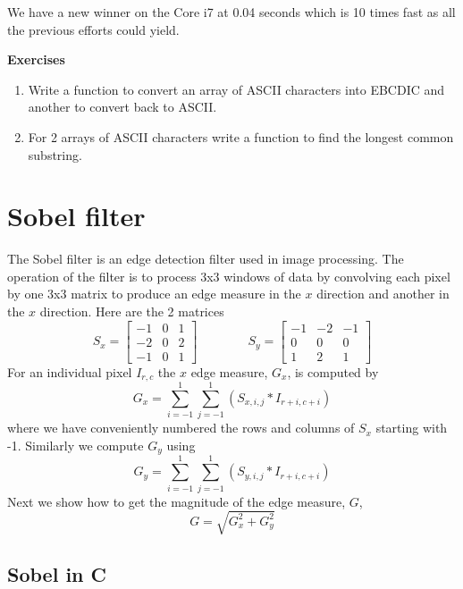 \documentclass[11pt,b5paper]{book}
\begin{document}
We have a new winner on the Core i7 at 0.04 seconds which is 10 times fast as
all the previous efforts could yield.

\vfill
\break
{\bf\large Exercises}

\begin{enumerate}
    \item Write a function to convert an array of ASCII characters into
    EBCDIC and another to convert back to ASCII.
    \item For 2 arrays of ASCII characters write a function to find the
    longest common substring.
\end{enumerate}


\chapter{Sobel filter}

The Sobel filter is an edge detection filter used in image processing.
The operation of the filter is to process 3x3 windows of data by convolving
each pixel by one 3x3 matrix to produce an edge measure in the $x$ direction
and another in the $x$ direction.
Here are the 2 matrices
$$
S_x = \left[\begin{matrix}
                -1 & 0 & 1 \\
                -2 & 0 & 2 \\
                -1 & 0 & 1
                \end{matrix}\right]
                \qquad\qquad
S_y = \left[\begin{matrix}
                -1 & -2 & -1 \\
                 0 & 0 & 0 \\
                 1 & 2 & 1
                \end{matrix}\right]
$$
For an individual pixel $I_{r,c}$ the $x$ edge measure, $G_x$, is computed
by
$$G_x = \sum_{i=-1}^{1}\sum_{j=-1}^1(S_{x,i,j}* I_{r+i,c+i})$$
where we have conveniently numbered the rows and columns of $S_x$ starting with
-1.  Similarly we compute $G_y$ using
$$G_y = \sum_{i=-1}^{1}\sum_{j=-1}^1(S_{y,i,j}*I_{r+i,c+i})$$
Next we show how to get the magnitude of the edge measure, $G$,
$$G = \sqrt{G_x^2+G_y^2}$$

\section{Sobel in C}
\end{document}
